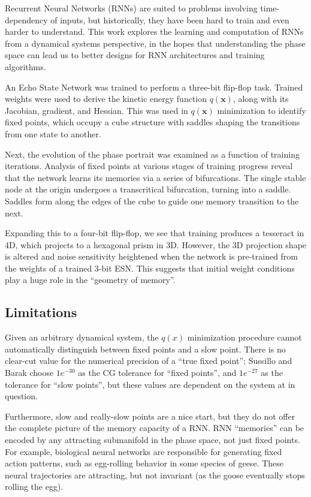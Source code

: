 \documentclass{article} %
\newcommand{\bf}[1]{\mathbf{#1}}
\newcommand{\x}{\bf{x}}
\begin{document}
Recurrent Neural Networks (RNNs) are suited to problems involving time-dependency of inputs, but historically, they have been hard to train and even harder to understand. This work explores the learning and computation of RNNs from a dynamical systems perspective, in the hopes that understanding the phase space can lead us to better designs for RNN architectures and training algorithms.

An Echo State Network was trained to perform a three-bit flip-flop task. Trained weights were used to derive the kinetic energy function $q(\x)$, along with its Jacobian, gradient, and Hessian. This was used in $q(\x)$ minimization to identify fixed points, which occupy a cube structure with saddles shaping the transitions from one state to another.

Next, the evolution of the phase portrait was examined as a function of training iterations. Analysis of fixed points at various stages of training progress reveal that the network learns its memories via a series of bifurcations. The single stable node at the origin undergoes a transcritical bifurcation, turning into a saddle. Saddles form along the edges of the cube to guide one memory transition to the next.

Expanding this to a four-bit flip-flop, we see that training produces a tesseract in 4D, which projects to a hexagonal prism in 3D. However, the 3D projection shape is altered and noise sensitivity heightened when the network is pre-trained from the weights of a trained 3-bit ESN. This suggests that initial weight conditions play a huge role in the ``geometry of memory''.

\subsection{Limitations}

Given an arbitrary dynamical system, the $q(x)$ minimization procedure cannot automatically distinguish between fixed points and a slow point. There is no clear-cut value for the numerical precision of a ``true fixed point''; Sussillo and Barak choose $1e^{-30}$ as the CG tolerance for ``fixed points'', and $1e^{-27}$ as the tolerance for ``slow points'', but these values are dependent on the system at in question.

Furthermore, slow and really-slow points are a nice start, but they do not offer the complete picture of the memory capacity of a RNN. RNN ``memories'' can be encoded by any attracting submanifold in the phase space, not just fixed points. For example, biological neural networks are responsible for generating fixed action patterns, such as egg-rolling behavior in some species of geese. These neural trajectories are attracting, but not invariant (as the goose eventually stops rolling the egg).
\end{document}
